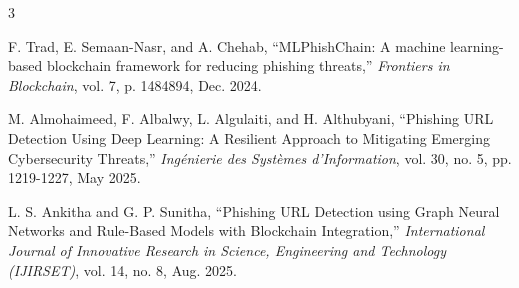 \label{ch:reference}
\begin{thebibliography}{3}

\vspace{.5cm}

F. Trad, E. Semaan-Nasr, and A. Chehab,  
``MLPhishChain: A machine learning-based blockchain framework for reducing phishing threats,''  
\textit{Frontiers in Blockchain}, vol. 7, p. 1484894, Dec. 2024.

M. Almohaimeed, F. Albalwy, L. Algulaiti, and H. Althubyani,  
``Phishing URL Detection Using Deep Learning: A Resilient Approach to Mitigating Emerging Cybersecurity Threats,''  
\textit{Ingénierie des Systèmes d'Information}, vol. 30, no. 5, pp. 1219-1227, May 2025.

L. S. Ankitha and G. P. Sunitha,  
``Phishing URL Detection using Graph Neural Networks and Rule-Based Models with Blockchain Integration,''  
\textit{International Journal of Innovative Research in Science, Engineering and Technology (IJIRSET)}, vol. 14, no. 8, Aug. 2025.

\end{thebibliography}